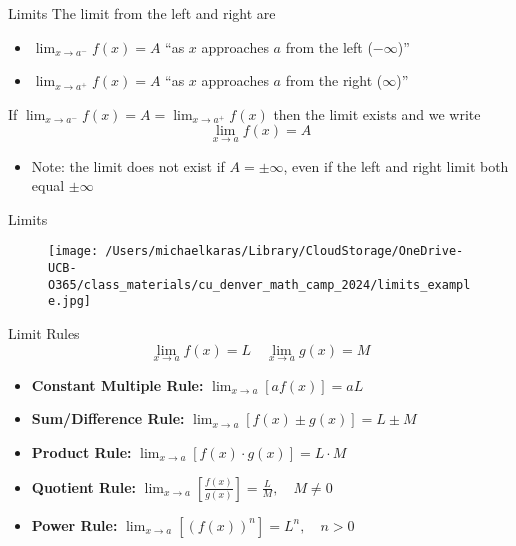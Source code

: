 \documentclass[aspectratio=169]{beamer}
\begin{document}
\begin{frame}{Limits}\label{main1}
The limit from the left and right are
\begin{itemize}
\begin{itemize}
    \item \(\lim_{x \to a^-} f(x) = A\) “as \(x\) approaches \(a\) from the left (\(-\infty\))”
    \item \(\lim_{x \to a^+} f(x) = A\) “as \(x\) approaches \(a\) from the right (\(\infty\))”
\end{itemize}
\end{itemize}
If \(\lim_{x \to a^-} f(x) = A = \lim_{x \to a^+} f(x)\) then the limit exists and we write
\[
\lim_{x \to a} f(x) = A
\]
\begin{itemize}
    \item Note: the limit does not exist if \(A = \pm\infty\), even if the left and right limit both equal \(\pm\infty\)
\end{itemize}
\end{frame}

\begin{frame}{Limits}\label{main1}
    \begin{figure}
        \centering
        \texttt{[image: /Users/michaelkaras/Library/CloudStorage/OneDrive-UCB-O365/class\_materials/cu\_denver\_math\_camp\_2024/limits\_example.jpg]}
    \end{figure}
\end{frame}

\begin{frame}{Limit Rules}\label{main1}
    \[
    \lim_{x \to a} f(x) = L \quad \lim_{x \to a} g(x) = M
    \]
    \vspace{1em}
    \begin{itemize}
        \item \textbf{Constant Multiple Rule:} \quad $\lim_{x \to a} [a f(x)] = a L$
        \item \textbf{Sum/Difference Rule:} \quad $\lim_{x \to a} [f(x) \pm g(x)] = L \pm M$
        \item \textbf{Product Rule:} \quad $\lim_{x \to a} [f(x) \cdot g(x)] = L \cdot M$
        \item \textbf{Quotient Rule:} \quad $\lim_{x \to a} \left[ \frac{f(x)}{g(x)} \right] = \frac{L}{M}, \quad M \neq 0$
        \item \textbf{Power Rule:} \quad $\lim_{x \to a} [(f(x))^n] = L^n, \quad n > 0$
    \end{itemize}
\end{frame}
\end{document}
